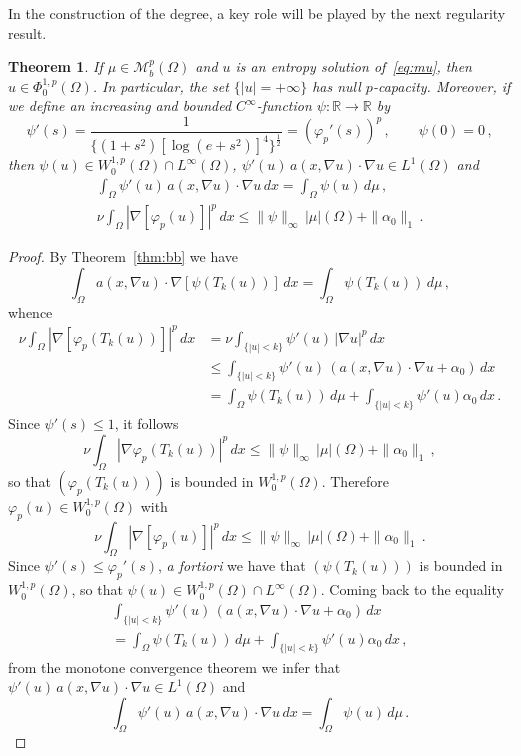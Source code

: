 \documentclass[twoside,reqno]{amsart}
\numberwithin{equation}{section}
\newtheorem{thm}{Theorem}[section]
\theoremstyle{definition}
\newcommand{\R}{\mathbb{R}}
\begin{document}
%
In the construction of the degree, a key role
will be played by the next regularity result.
%
\begin{thm}
\label{thm:regentr}
If $\mu\in \mathcal{M}_b^p(\Omega)$ and $u$ is an entropy 
solution of~\eqref{eq:mu}, then $u\in \Phi^{1,p}_0(\Omega)$.
In particular, the set $\{|u|=+\infty\}$ has null $p$-capacity.
Moreover, if we define an increasing and bounded 
$C^\infty$-function $\psi:\R\rightarrow\R$ by
\[
\psi'(s) = 
\frac{1}{\{(1+s^2)[\log(e+s^2)]^4
\}^{\frac{1}{2}}}
= (\varphi_p'(s))^p
\,,\qquad\psi(0)=0\,,
\]
then 
$\psi(u)\in W^{1,p}_0(\Omega)\cap L^{\infty}(\Omega)$,
$\psi'(u)\,a(x,\nabla u)\cdot \nabla u\in L^1(\Omega)$
and
\begin{gather}
\label{eq:sol}
\int_{\Omega} \psi'(u)\,a(x,\nabla u)\cdot \nabla u\,dx =
\int_\Omega \psi(u)\,d\mu\,,\\
\label{eq:estimate}
\nu \int_\Omega |\nabla [\varphi_p(u)]|^p\,dx \leq
\|\psi\|_\infty\,|\mu|(\Omega) + \|\alpha_0\|_1\,.
\end{gather}
\end{thm}
%
\begin{proof}
By Theorem~\ref{thm:bb} we have
\[
\int_\Omega a(x,\nabla u)\cdot \nabla[\psi(T_k(u))]\,dx =
\int_\Omega \psi(T_k(u))\,d\mu\,,
\]
whence
\[
\begin{split}
\nu \int_\Omega |\nabla[\varphi_p(T_k(u))]|^p\,dx
&=
\nu \int_{\{|u|<k\}} \psi'(u)\,|\nabla u|^p\,dx \\
&\leq
\int_{\{|u|<k\}} \psi'(u)\,
\left(a(x,\nabla u)\cdot \nabla u + \alpha_0\right)\,dx \\
&=
\int_\Omega \psi(T_k(u))\,d\mu 
+ \int_{\{|u|<k\}} \psi'(u)\alpha_0\,dx\,.
\end{split}
\]
Since $\psi'(s)\leq 1$, it follows
\[
\nu \int_\Omega |\nabla \varphi_p(T_k(u))|^p\,dx
\leq
\|\psi\|_\infty \, |\mu|(\Omega) + \|\alpha_0\|_1\,,
\]
so that $(\varphi_p(T_k(u)))$ is bounded in $W^{1,p}_0(\Omega)$.
Therefore $\varphi_p(u)\in W^{1,p}_0(\Omega)$ with
\[
\nu \int_\Omega |\nabla [\varphi_p(u)]|^p\,dx \leq
\|\psi\|_\infty\,|\mu|(\Omega) + \|\alpha_0\|_1\,.
\]
Since $\psi'(s)\leq \varphi_p'(s)$, 
\emph{a fortiori} we have that $(\psi(T_k(u)))$ 
is bounded in $W^{1,p}_0(\Omega)$, so that 
$\psi(u)\in W^{1,p}_0(\Omega)\cap L^\infty(\Omega)$.
Coming back to the equality
\begin{multline*}
\int_{\{|u|<k\}} \psi'(u)\,
\left(a(x,\nabla u)\cdot \nabla u + \alpha_0\right)\,dx \\
=
\int_\Omega \psi(T_k(u))\,d\mu 
+ \int_{\{|u|<k\}} \psi'(u)\alpha_0\,dx\,,
\end{multline*}
from the monotone convergence theorem we infer that
$\psi'(u)\,a(x,\nabla u)\cdot \nabla u \in L^1(\Omega)$
and
\[
\int_{\Omega} \psi'(u)\,a(x,\nabla u)\cdot \nabla u\,dx 
= \int_\Omega \psi(u)\,d\mu \,.
\]
\end{proof}
\end{document}
